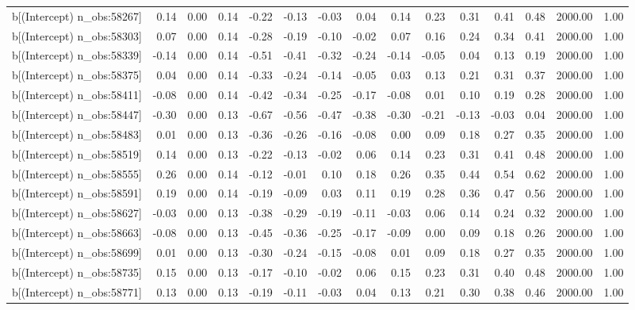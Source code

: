 \begin{table}[ht]
\begin{tabular}{rrrrrrrrrrrrrrr}
  b[(Intercept) n\_obs:58267] & 0.14 & 0.00 & 0.14 & -0.22 & -0.13 & -0.03 & 0.04 & 0.14 & 0.23 & 0.31 & 0.41 & 0.48 & 2000.00 & 1.00 \\ 
  b[(Intercept) n\_obs:58303] & 0.07 & 0.00 & 0.14 & -0.28 & -0.19 & -0.10 & -0.02 & 0.07 & 0.16 & 0.24 & 0.34 & 0.41 & 2000.00 & 1.00 \\ 
  b[(Intercept) n\_obs:58339] & -0.14 & 0.00 & 0.14 & -0.51 & -0.41 & -0.32 & -0.24 & -0.14 & -0.05 & 0.04 & 0.13 & 0.19 & 2000.00 & 1.00 \\ 
  b[(Intercept) n\_obs:58375] & 0.04 & 0.00 & 0.14 & -0.33 & -0.24 & -0.14 & -0.05 & 0.03 & 0.13 & 0.21 & 0.31 & 0.37 & 2000.00 & 1.00 \\ 
  b[(Intercept) n\_obs:58411] & -0.08 & 0.00 & 0.14 & -0.42 & -0.34 & -0.25 & -0.17 & -0.08 & 0.01 & 0.10 & 0.19 & 0.28 & 2000.00 & 1.00 \\ 
  b[(Intercept) n\_obs:58447] & -0.30 & 0.00 & 0.13 & -0.67 & -0.56 & -0.47 & -0.38 & -0.30 & -0.21 & -0.13 & -0.03 & 0.04 & 2000.00 & 1.00 \\ 
  b[(Intercept) n\_obs:58483] & 0.01 & 0.00 & 0.13 & -0.36 & -0.26 & -0.16 & -0.08 & 0.00 & 0.09 & 0.18 & 0.27 & 0.35 & 2000.00 & 1.00 \\ 
  b[(Intercept) n\_obs:58519] & 0.14 & 0.00 & 0.13 & -0.22 & -0.13 & -0.02 & 0.06 & 0.14 & 0.23 & 0.31 & 0.41 & 0.48 & 2000.00 & 1.00 \\ 
  b[(Intercept) n\_obs:58555] & 0.26 & 0.00 & 0.14 & -0.12 & -0.01 & 0.10 & 0.18 & 0.26 & 0.35 & 0.44 & 0.54 & 0.62 & 2000.00 & 1.00 \\ 
  b[(Intercept) n\_obs:58591] & 0.19 & 0.00 & 0.14 & -0.19 & -0.09 & 0.03 & 0.11 & 0.19 & 0.28 & 0.36 & 0.47 & 0.56 & 2000.00 & 1.00 \\ 
  b[(Intercept) n\_obs:58627] & -0.03 & 0.00 & 0.13 & -0.38 & -0.29 & -0.19 & -0.11 & -0.03 & 0.06 & 0.14 & 0.24 & 0.32 & 2000.00 & 1.00 \\ 
  b[(Intercept) n\_obs:58663] & -0.08 & 0.00 & 0.13 & -0.45 & -0.36 & -0.25 & -0.17 & -0.09 & 0.00 & 0.09 & 0.18 & 0.26 & 2000.00 & 1.00 \\ 
  b[(Intercept) n\_obs:58699] & 0.01 & 0.00 & 0.13 & -0.30 & -0.24 & -0.15 & -0.08 & 0.01 & 0.09 & 0.18 & 0.27 & 0.35 & 2000.00 & 1.00 \\ 
  b[(Intercept) n\_obs:58735] & 0.15 & 0.00 & 0.13 & -0.17 & -0.10 & -0.02 & 0.06 & 0.15 & 0.23 & 0.31 & 0.40 & 0.48 & 2000.00 & 1.00 \\ 
  b[(Intercept) n\_obs:58771] & 0.13 & 0.00 & 0.13 & -0.19 & -0.11 & -0.03 & 0.04 & 0.13 & 0.21 & 0.30 & 0.38 & 0.46 & 2000.00 & 1.00 \\ 

\end{tabular}
\end{table}
